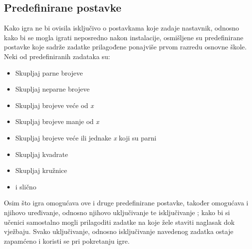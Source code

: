 \documentclass[times, utf8, zavrsni, numeric]{fer}
\begin{document}
		\subsection{Predefinirane postavke}
		Kako igra ne bi ovisila isključivo o postavkama koje zadaje nastavnik, odnosno kako bi se mogla igrati neposredno nakon instalacije, osmišljene su predefinirane postavke koje sadrže zadatke prilagođene ponajviše prvom razredu osnovne škole.
		Neki od predefiniranih zadataka su: 
			\begin{itemize}
				\item  {Skupljaj parne brojeve}
				\item  {Skupljaj neparne brojeve}
				\item  {Skupljaj brojeve veće od \textit{x}}
				\item  {Skupljaj brojeve manje od \textit{x}}
				\item  {Skupljaj brojeve veće ili jednake \textit{x} koji su parni }
				\item  {Skupljaj kvadrate}
				\item  {Skupljaj kružnice}
				\item {i slično}
			\end{itemize}
		Osim što igra omogućava ove i druge predefinirane postavke, također omogućava i njihovo uređivanje, odnosno njihovo uključivanje te isključivanje \cite{customview}; kako bi si učenici samostalno mogli prilagoditi zadatke na koje žele staviti naglasak dok vježbaju.
		Svako uključivanje, odnosno isključivanje navedenog zadatka ostaje zapamćeno i koristi se pri pokretanju igre.
		
\end{document}

